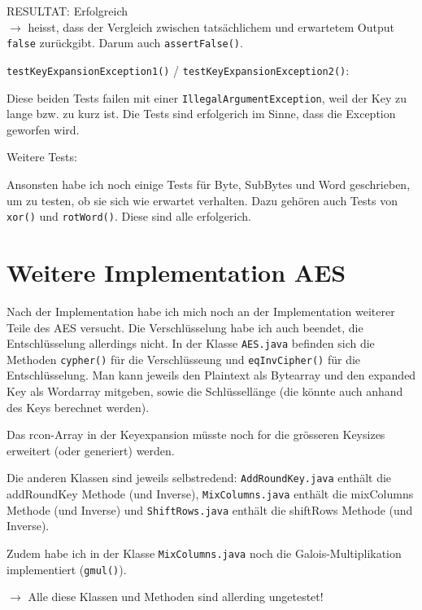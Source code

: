 \documentclass[12pt, letterpaper]{article}
\newcommand{\code}[1]{\texttt{#1}}
\begin{document}
RESULTAT: {\color{dgreen}Erfolgreich}\\
$\rightarrow$ heisst, dass der Vergleich zwischen tatsächlichem und erwartetem Output \code{false} zurückgibt. Darum auch \code{assertFalse()}.

\code{testKeyExpansionException1()} / \code{testKeyExpansionException2()}:

Diese beiden Tests failen mit einer \code{IllegalArgumentException}, weil der Key zu lange bzw. zu kurz ist. Die Tests sind {\color{dgreen}erfolgerich} im Sinne, dass die Exception geworfen wird.

Weitere Tests:

Ansonsten habe ich noch einige Tests für Byte, SubBytes und Word geschrieben, um zu testen, ob sie sich wie erwartet verhalten. Dazu gehören auch Tests von \code{xor()} und \code{rotWord()}. Diese sind alle {\color{dgreen}erfolgerich}.

\newpage
\section*{Weitere Implementation AES}
Nach der Implementation habe ich mich noch an der Implementation weiterer Teile des AES versucht. Die Verschlüsselung habe ich auch beendet, die Entschlüsselung allerdings nicht. In der Klasse \code{AES.java} befinden sich die Methoden \code{cypher()} für die Verschlüsseung und \code{eqInvCipher()} für die Entschlüsselung. Man kann jeweils den Plaintext als Bytearray und den expanded Key als Wordarray mitgeben, sowie die Schlüssellänge (die könnte auch anhand des Keys berechnet werden).

Das rcon-Array in der Keyexpansion müsste noch for die grösseren Keysizes erweitert (oder generiert) werden.

Die anderen Klassen sind jeweils selbstredend: \code{AddRoundKey.java} enthält die addRoundKey Methode (und Inverse), \code{MixColumns.java} enthält die mixColumns Methode (und Inverse) und \code{ShiftRows.java} enthält die shiftRows Methode (und Inverse). 

Zudem habe ich in der Klasse \code{MixColumns.java} noch die Galois-Multiplikation implementiert (\code{gmul()}).

$\rightarrow$ Alle diese Klassen und Methoden sind allerding ungetestet!
\end{document}
